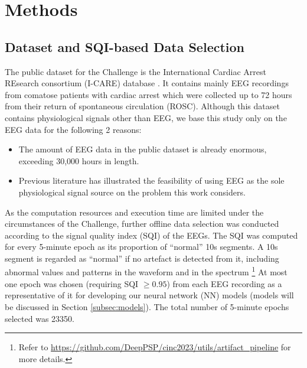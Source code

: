 \section{Methods}
\label{sec:methods}


\subsection{Dataset and SQI-based Data Selection}
\label{subsec:data_selection}

The public dataset for the Challenge is the International Cardiac Arrest REsearch consortium (I-CARE) database \cite{Amorim_2023_ICAREDatabase}. It contains mainly EEG recordings from comatose patients with cardiac arrest which were collected up to 72 hours from their return of spontaneous circulation (ROSC). Although this dataset contains physiological signals other than EEG, we base this study only on the EEG data for the following 2 reasons:
\begin{itemize}
    \item The amount of EEG data in the public dataset is already enormous, exceeding 30,000 hours in length.
    \item Previous literature \cite{Zheng_2021_coma} has illustrated the feasibility of using EEG as the sole physiological signal source on the problem this work considers.
\end{itemize}

As the computation resources and execution time are limited under the circumstances of the Challenge, further offline data selection was conducted according to the signal quality index (SQI) of the EEGs. The SQI was computed for every 5-minute epoch as its proportion of ``normal'' 10s segments. A 10s segment is regarded as ``normal'' if no artefact is detected from it, including abnormal values and patterns in the waveform and in the spectrum \footnote{Refer to \url{https://github.com/DeepPSP/cinc2023/utils/artifact_pipeline} for more details.}
At most one epoch was chosen (requiring SQI $\ge 0.95$) from each EEG recording as a representative of it for developing our neural network (NN) models (models will be discussed in Section \ref{subsec:models}). The total number of 5-minute epochs selected was 23350.




